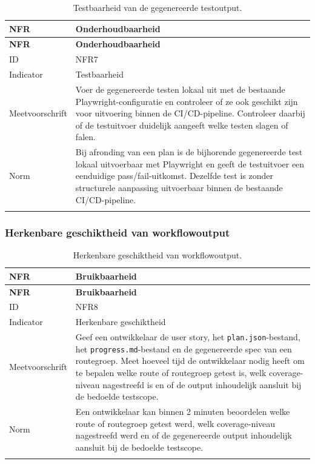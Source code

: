 \begin{longtable}{p{}p{}}
    \toprule
    \textbf{NFR} & \textbf{Onderhoudbaarheid} \\
    \midrule
    \endfirsthead
    
    \toprule
    \textbf{NFR} & \textbf{Onderhoudbaarheid} \\
    \midrule
    \endhead
    
    ID & NFR7 \\
    \midrule
    Indicator & Testbaarheid \\
    \midrule
    Meetvoorschrift & Voer de gegenereerde testen lokaal uit met de bestaande Playwright-configuratie en controleer of ze ook geschikt zijn voor uitvoering binnen de CI/CD-pipeline. Controleer daarbij of de testuitvoer duidelijk aangeeft welke testen slagen of falen. \\
    \midrule
    Norm & Bij afronding van een plan is de bijhorende gegenereerde test lokaal uitvoerbaar met Playwright en geeft de testuitvoer een eenduidige pass/fail-uitkomst. Dezelfde test is zonder structurele aanpassing uitvoerbaar binnen de bestaande CI/CD-pipeline. \\
    
    \bottomrule
    \caption[NFR7: testbaarheid]{Testbaarheid van de gegenereerde testoutput.}
    \label{tab:nfr-testbaarheid}
\end{longtable}

\subsubsection{Herkenbare geschiktheid van workflowoutput}

\begin{longtable}{p{}p{}}
    \toprule
    \textbf{NFR} & \textbf{Bruikbaarheid} \\
    \midrule
    \endfirsthead
    
    \toprule
    \textbf{NFR} & \textbf{Bruikbaarheid} \\
    \midrule
    \endhead
    
    ID & NFR8 \\
    \midrule
    Indicator & Herkenbare geschiktheid \\
    \midrule
    Meetvoorschrift & Geef een ontwikkelaar de user story, het \texttt{plan.json}-bestand, het \texttt{progress.md}-bestand en de gegenereerde spec van een routegroep. Meet hoeveel tijd de ontwikkelaar nodig heeft om te bepalen welke route of routegroep getest is, welk coverage-niveau nagestreefd is en of de output inhoudelijk aansluit bij de bedoelde testscope. \\
    \midrule
    Norm & Een ontwikkelaar kan binnen 2 minuten beoordelen welke route of routegroep getest werd, welk coverage-niveau nagestreefd werd en of de gegenereerde output inhoudelijk aansluit bij de bedoelde testscope. \\
    
    \bottomrule
    \caption[NFR8: herkenbare geschiktheid]{Herkenbare geschiktheid van workflowoutput.}
    \label{tab:nfr-herkenbare-geschiktheid}
\end{longtable}

